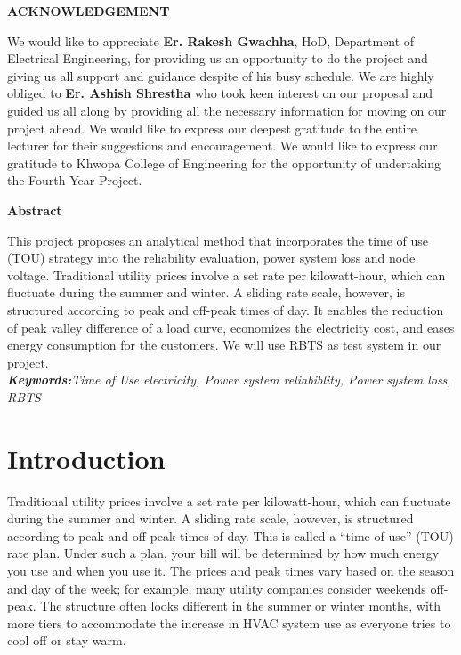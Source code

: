 \documentclass[14 pt]{article}
\begin{document}
\pagebreak
{}
\begin{center}
\textbf{ACKNOWLEDGEMENT}
\end{center}
\vspace{0.3cm}
We would like to appreciate \textbf{Er. Rakesh Gwachha}, HoD, Department of Electrical
\onehalfspacing
Engineering, for providing us an opportunity to do the project and giving us all support and guidance despite of his busy schedule. We are highly obliged to \textbf{Er. Ashish
Shrestha} who took keen interest on our proposal and guided us all along by providing all the necessary information for moving on our project ahead. We would like to
express our deepest gratitude to the entire lecturer for their suggestions and encouragement. We would like to express our gratitude to Khwopa College of Engineering for the
opportunity of undertaking the Fourth Year Project.
\pagebreak
\begin{center}
\textbf{Abstract}
\end{center}
\smallskip


This project proposes an analytical method that incorporates 
the time of use
(TOU) strategy into the reliability evaluation, power system loss and node voltage.
Traditional utility prices involve a set rate per kilowatt-hour, which can fluctuate during the summer and winter. A sliding rate scale, however, is structured
according to peak and off-peak times of day. It enables the reduction of peak valley difference of a load curve, economizes the electricity cost, and eases energy
consumption for the customers. We will use RBTS as test system in our project.\\
\textbf{\textit{Keywords:}}\textit{Time of Use electricity, Power system reliabiblity, Power system loss,
RBTS}
\pagebreak
\tableofcontents
\pagebreak
\listoffigures
\pagebreak
{}
\section{Introduction}
Traditional utility prices involve a set rate per kilowatt-hour, which can fluctuate
during the summer and winter. A sliding rate scale, however, is structured according to peak and off-peak times of day. This is called a “time-of-use” (TOU) rate
plan. Under such a plan, your bill will be determined by how much energy you use
and when you use it. The prices and peak times vary based on the season and day
of the week; for example, many utility companies consider weekends off-peak.
The structure often looks different in the summer or winter months, with more
tiers to accommodate the increase in HVAC system use as everyone tries to cool
off or stay warm.
\end{document}
